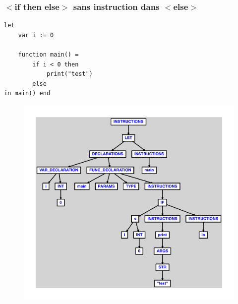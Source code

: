 \documentclass{article}
\begin{document}
\subsubsection{$ < $if then else$ > $ sans instruction dans $ < $else$ > $}
\begin{lstlisting}
let
	var i := 0

	function main() =
		if i < 0 then
			print("test")
		else
in main() end
\end{lstlisting}
\newpage
\begin{figure}[H]
\centering
\includegraphics[max width=\textwidth]{ast/ast_255.pdf}
\end{figure}
\newpage
\end{document}
